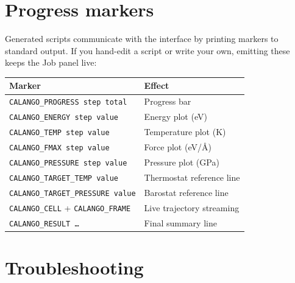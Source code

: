 \section{Progress markers}

Generated scripts communicate with the interface by printing markers to
standard output. If you hand-edit a script or write your own, emitting
these keeps the Job panel live:

\begin{center}
\small
\begin{tabular}{@{}ll@{}}
\toprule
Marker & Effect \\
\midrule
\texttt{CALANGO\_PROGRESS step total}   & Progress bar \\
\texttt{CALANGO\_ENERGY step value}     & Energy plot (eV) \\
\texttt{CALANGO\_TEMP step value}       & Temperature plot (K) \\
\texttt{CALANGO\_FMAX step value}       & Force plot (eV/\AA) \\
\texttt{CALANGO\_PRESSURE step value}   & Pressure plot (GPa) \\
\texttt{CALANGO\_TARGET\_TEMP value}    & Thermostat reference line \\
\texttt{CALANGO\_TARGET\_PRESSURE value}& Barostat reference line \\
\texttt{CALANGO\_CELL} + \texttt{CALANGO\_FRAME} & Live trajectory streaming \\
\texttt{CALANGO\_RESULT \ldots}         & Final summary line \\
\bottomrule
\end{tabular}
\end{center}

\section{Troubleshooting}

